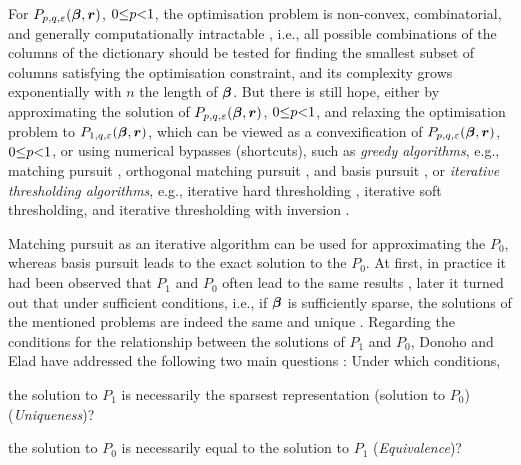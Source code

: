 For $P_{p,q,\varepsilon}(\boldsymbol{\beta},\boldsymbol{r})$, $0 {\leq} p {<} 1$, the optimisation problem is non-convex, combinatorial, and generally computationally intractable \cite{Davis1997}, i.e., all possible combinations of the columns of the dictionary should be tested for finding the smallest subset of columns satisfying the optimisation constraint, and its complexity grows exponentially with $n$ the length of $\boldsymbol{\beta}$.
But there is still hope, either by approximating the solution of $P_{p,q,\varepsilon}(\boldsymbol{\beta},\boldsymbol{r})$, $0 {\leq} p {<} 1$, and relaxing the optimisation problem to $P_{1,q,\varepsilon}(\boldsymbol{\beta},\boldsymbol{r})$, which can be viewed as a convexification of $P_{p,q,\varepsilon}(\boldsymbol{\beta},\boldsymbol{r})$, $0 {\leq} p {<} 1$, or using numerical bypasses (shortcuts), such as \emph{greedy algorithms}, e.g., matching pursuit \cite{Mallat1993,Mallat2008}, orthogonal matching pursuit \cite{Pati1993,Mallat1993,Davis1997}, and basis pursuit \cite{Chen2001}, or \emph{iterative thresholding algorithms}, e.g., iterative hard thresholding \cite{Figueiredo2003,Daubechies2008,Blumensath2008,Blumensath2009a}, iterative soft thresholding, and iterative thresholding with inversion \cite{Maleki2009,Maleki2010}. 

Matching pursuit as an iterative algorithm can be used for approximating the $P_0$, whereas basis pursuit leads to the exact solution to the $P_0$.
At first, in practice it had been observed that $P_1$ and $P_0$ often lead to the same results \cite{Chen2001}, later it turned out that under sufficient conditions, i.e., if $\boldsymbol{\beta}$ is sufficiently sparse, the solutions of the mentioned problems are indeed the same and unique \cite{Donoho2001,Elad2001}.
Regarding the conditions for the relationship between the solutions of $P_1$ and $P_0$, Donoho and Elad have addressed the following two main questions \cite{Donoho2003,Donoho2003a}: Under which conditions,

\begin{list}{Q:}{}
\item the solution to $P_1$ is necessarily the sparsest representation (solution to $P_0$) (\emph{Uniqueness})?\\
\item the solution to $P_0$ is necessarily equal to the solution to $P_1$ (\emph{Equivalence})?
\end{list}

